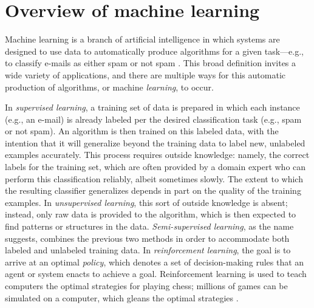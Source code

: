 \documentclass[12pt]{article} %
\begin{document}
\section{Overview of machine learning}
Machine learning is a branch of artificial intelligence in which systems are designed to use data to automatically produce algorithms for a given task---e.g., to classify e-mails as either spam or not spam \cite{alpaydin2010}.
This broad definition invites a wide variety of applications, and there are multiple ways for this automatic production of algorithms, or machine \textit{learning}, to occur.

In \textit{supervised learning}, a training set of data is prepared in which each instance (e.g., an e-mail) is already labeled per the desired classification task (e.g., spam or not spam).
An algorithm is then trained on this labeled data, with the intention that it will generalize beyond the training data to label new, unlabeled examples accurately.
This process requires outside knowledge: namely, the correct labels for the training set, which are often provided by a domain expert who can perform this classification reliably, albeit sometimes slowly.
The extent to which the resulting classifier generalizes depends in part on the quality of the training examples.
In \textit{unsupervised learning}, this sort of outside knowledge is absent; instead, only raw data is provided to the algorithm, which is then expected to find patterns or structures in the data.
\textit{Semi-supervised learning}, as the name suggests, combines the previous two methods in order to accommodate both labeled and unlabeled training data.
In \textit{reinforcement learning}, the goal is to arrive at an optimal \textit{policy}, which denotes a set of decision-making rules that an agent or system enacts to achieve a goal. Reinforcement learning is used to teach computers the optimal strategies for playing chess; millions of games can be simulated on a computer, which gleans the optimal strategies \cite{alpaydin2010}.
\end{document}
